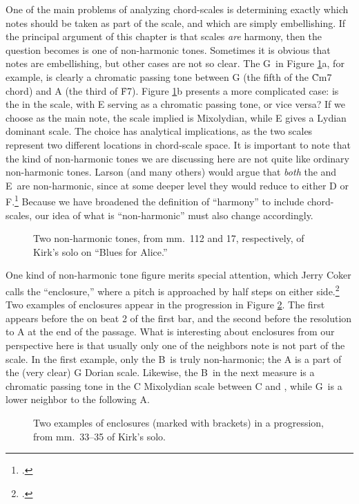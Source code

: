 One of the main problems of analyzing chord-scales is determining exactly
which notes should be taken as part of the scale, and which are simply
embellishing. If the principal argument of this chapter is that scales
\emph{are} harmony, then the question becomes is one of non-harmonic tones.
Sometimes it is obvious that notes are embellishing, but other cases are not
so clear. The G\sharp\ in Figure \ref{csa:non-harmonic-tones}a, for example,
is clearly a chromatic passing tone between G (the fifth of the \h{Cm7} chord)
and A (the third of \h{F7}). Figure \ref{csa:non-harmonic-tones}b presents a
more complicated case: is the \Eflat in the scale, with E\nat{} serving as a
chromatic passing tone, or vice versa? If we choose \Eflat as the main note,
the scale implied is \Bflat Mixolydian, while E\nat{} gives a \Bflat Lydian
dominant scale. The choice has analytical implications, as the two scales
represent two different locations in chord-scale space. It is important to
note that the kind of non-harmonic tones we are discussing here are not quite
like ordinary non-harmonic tones. Larson (and many others) would argue that
\emph{both} the \Eflat and E\nat\ are non-harmonic, since at some deeper
level they would reduce to either D or F.\footcite[5--10]{larson:2009} Because
we have broadened the definition of ``harmony'' to include chord-scales, our
idea of what is ``non-harmonic'' must also change accordingly.

\begin{figure}[tbp]
  \caption[Two non-harmonic tones in Kirk's solo]{Two non-harmonic tones, from
    mm.~112 and 17, respectively, of Kirk's solo on ``Blues for Alice.''}
  \label{csa:non-harmonic-tones}
\end{figure}

One kind of non-harmonic tone figure merits special attention, which Jerry
Coker calls the ``enclosure,'' where a pitch is approached by half steps on
either side.\footcite[50--54]{coker:elements} Two examples of enclosures
appear in the \tfo progression in Figure \ref{csa:enclosures}. The first
appears before the \Bflat on beat 2 of the first bar, and the second before
the resolution to A at the end of the passage. What is interesting about
enclosures from our perspective here is that usually only one of the neighbors
note is not part of the scale. In the first example, only the B\nat\ is truly
non-harmonic; the A is a part of the (very clear) G Dorian scale. Likewise,
the B\nat\ in the next measure is a chromatic passing tone in the C Mixolydian
scale between C and \Bflat, while G\sharp\ is a lower neighbor to the
following A.

\begin{figure}[tbp]
  \caption[Two examples of enclosures in a \tfo progression.]{Two examples of
    enclosures (marked with brackets) in a \tfo progression, from mm.~33--35
    of Kirk's solo.}
  \label{csa:enclosures}
\end{figure}





